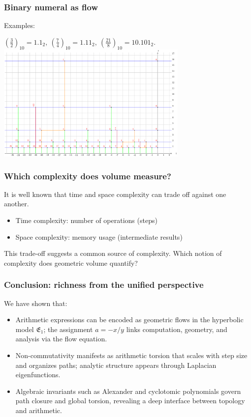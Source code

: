 \documentclass[aspectratio=169]{beamer}
\begin{document}
\begin{frame}
    \frametitle{Binary numeral as flow}
            Examples:
    \begin{center}
         $\left(\frac{3}{2}\right)_{10} = 1.1_{2},\ \left(\frac{7}{4}\right)_{10} = 1.11_{2},\ \left(\frac{21}{8}\right)_{10} = 10.101_{2}.$
        \includegraphics[width=0.7\textwidth]{../images/multiplication}
    \end{center}
\end{frame}

\begin{frame}
    \frametitle{Which complexity does volume measure?}
    It is well known that time and space complexity can trade off against one another.
    \begin{itemize}
        \item Time complexity: number of operations (steps)
        \item Space complexity: memory usage (intermediate results)
    \end{itemize}
    This trade-off suggests a common source of complexity. Which notion of complexity does geometric volume quantify?
\end{frame}

\begin{frame}
    \frametitle{Conclusion: richness from the unified perspective}
    We have shown that:
    \begin{itemize}
        \item Arithmetic expressions can be encoded as geometric flows in the hyperbolic model $\mathfrak{E}_1$; the assignment $a=-x/y$ links computation, geometry, and analysis via the flow equation.
        \item Non-commutativity manifests as arithmetic torsion that scales with step size and organizes paths; analytic structure appears through Laplacian eigenfunctions.
        \item Algebraic invariants such as Alexander and cyclotomic polynomials govern path closure and global torsion, revealing a deep interface between topology and arithmetic.
    \end{itemize}
\end{frame}
\end{document}

